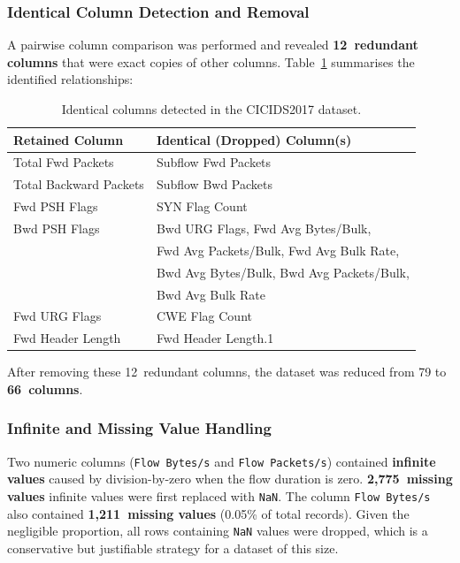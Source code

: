 \documentclass[12pt, a4paper]{article}
\begin{document}
\subsubsection{Identical Column Detection and Removal}
A pairwise column comparison was performed and revealed \textbf{12~redundant columns} that were exact copies of other columns.
Table~\ref{tab:identical_cols} summarises the identified relationships:

\begin{table}[H]
\centering
\caption{Identical columns detected in the CICIDS2017 dataset.}
\label{tab:identical_cols}
\begin{tabular}{@{}ll@{}}
\toprule
\textbf{Retained Column}    & \textbf{Identical (Dropped) Column(s)} \\
\midrule
Total Fwd Packets            & Subflow Fwd Packets \\
Total Backward Packets       & Subflow Bwd Packets \\
Fwd PSH Flags                & SYN Flag Count \\
Bwd PSH Flags                & Bwd URG Flags, Fwd Avg Bytes/Bulk, \\
                             & Fwd Avg Packets/Bulk, Fwd Avg Bulk Rate, \\
                             & Bwd Avg Bytes/Bulk, Bwd Avg Packets/Bulk, \\
                             & Bwd Avg Bulk Rate \\
Fwd URG Flags                & CWE Flag Count \\
Fwd Header Length            & Fwd Header Length.1 \\
\bottomrule
\end{tabular}
\end{table}

\noindent
After removing these 12~redundant columns, the dataset was reduced from 79 to \textbf{66~columns}.

\subsubsection{Infinite and Missing Value Handling}
Two numeric columns (\texttt{Flow Bytes/s} and \texttt{Flow Packets/s}) contained \textbf{infinite values} caused by division-by-zero when the flow duration is zero.
\textbf{2,775~missing values} infinite values were first replaced with \texttt{NaN}.
The column \texttt{Flow Bytes/s} also contained \textbf{1,211~missing values} (0.05\% of total records).
Given the negligible proportion, all rows containing \texttt{NaN} values were dropped, which is a conservative but justifiable strategy for a dataset of this size.
\end{document}
